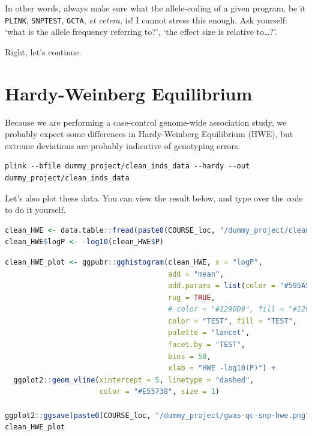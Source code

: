 \documentclass[
]{book}
\newcommand{\passthrough}[1]{#1}
\begin{document}
In other words, always make sure what the allele-coding of a given program, be it \passthrough{\lstinline!PLINK!}, \passthrough{\lstinline!SNPTEST!}, \passthrough{\lstinline!GCTA!}, \emph{et cetera}, is! I cannot stress this enough. Ask yourself: `what is the allele frequency referring to?', `the effect size is relative to\ldots?'.

Right, let's continue.

\hypertarget{hardy-weinberg-equilibrium}{%
\section{Hardy-Weinberg Equilibrium}\label{hardy-weinberg-equilibrium}}

Because we are performing a case-control genome-wide association study, we probably expect some differences in Hardy-Weinberg Equilibrium (HWE), but extreme deviations are probably indicative of genotyping errors.

\begin{lstlisting}
plink --bfile dummy_project/clean_inds_data --hardy --out dummy_project/clean_inds_data
\end{lstlisting}

Let's also plot these data. You can view the result below, and type over the code to do it yourself.

\begin{lstlisting}[language=R]
clean_HWE <- data.table::fread(paste0(COURSE_loc, "/dummy_project/clean_inds_data.hwe"))
clean_HWE$logP <- -log10(clean_HWE$P)
\end{lstlisting}

\begin{lstlisting}[language=R]
clean_HWE_plot <- ggpubr::gghistogram(clean_HWE, x = "logP",
                                      add = "mean",
                                      add.params = list(color = "#595A5C", linetype = "dashed", size = 1),
                                      rug = TRUE,
                                      # color = "#1290D9", fill = "#1290D9",
                                      color = "TEST", fill = "TEST",
                                      palette = "lancet",
                                      facet.by = "TEST",
                                      bins = 50,
                                      xlab = "HWE -log10(P)") +
  ggplot2::geom_vline(xintercept = 5, linetype = "dashed",
                      color = "#E55738", size = 1)

ggplot2::ggsave(paste0(COURSE_loc, "/dummy_project/gwas-qc-snp-hwe.png"), plot = clean_HWE_plot)
clean_HWE_plot
\end{lstlisting}
\end{document}
